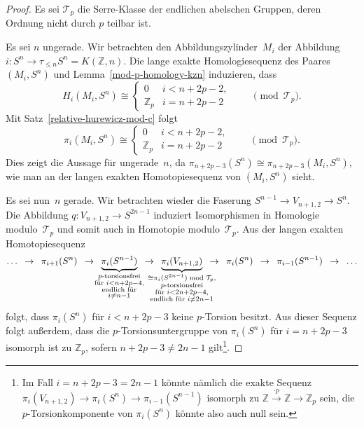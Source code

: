 \documentclass[11pt, a4paper, german]{article}
\theoremstyle{definition}
\theoremstyle{remark}
\newcommand{\R}{\mathbb{R}} %
\newcommand{\Z}{\mathbb{Z}} %
\newcommand{\T}{\mathcal{T}} %
\newcommand{\V}[2]{V_{{#2},{#1}}} %
\begin{document}
\begin{proof}
  Es sei $\T_p$ die Serre-Klasse der endlichen abelschen Gruppen, deren Ordnung nicht durch $p$ teilbar ist.

  Es sei $n$ ungerade.
  Wir betrachten den Abbildungszylinder~$M_i$ der Abbildung $i : S^n \to \tau_{\leq n} S^n = K(\Z, n)$.
  Die lange exakte Homologiesequenz des Paares $(M_i, S^n)$ und Lemma~\ref{mod-p-homology-kzn} induzieren, dass
  \[
   H_i(M_i, S^n) \cong \begin{cases}
     0 & i < n + 2p - 2, \\
     \Z_p & i = n + 2p - 2
   \end{cases}
   \qquad \pmod{\T_p}.
  \]
  Mit Satz~\ref{relative-hurewicz-mod-c} folgt
  \[
   \pi_i(M_i, S^n) \cong \begin{cases}
     0 & i < n + 2p - 2, \\
     \Z_p & i = n + 2p - 2
   \end{cases}
   \qquad \pmod{\T_p}.
  \]
  Dies zeigt die Aussage für ungerade~$n$, da $\pi_{n+2p-3}(S^n) \cong \pi_{n+2p-3}(M_i, S^n)$, wie man an der langen exakten Homotopiesequenz von $(M_i, S^n)$ sieht.

  Es sei nun~$n$ gerade.
  Wir betrachten wieder die Faserung $S^{n-1} \to \V{2}{n+1} \to S^n$.
  Die Abbildung $q : \V{2}{n+1} \to S^{2n-1}$ induziert Isomorphismen in Homologie modulo~$\T_p$ und somit auch in Homotopie modulo~$\T_p$.
  Aus der langen exakten Homotopiesequenz
  \[
    \ldots
    \enspace\to\enspace
    \pi_{i+1}(S^n)
    \enspace\to\enspace
    \underbrace{\pi_i(S^{n-1})}_{\mathclap{\substack{\text{$p$-torsionsfrei} \\ \text{für } i < n + 2p - 4, \\ \text{endlich für} \\ i \neq n-1}}}
    \enspace\to\enspace \underbrace{\pi_i(\V{2}{n+1})}_{\mathclap{\substack{\cong \pi_i(S^{2n-1}) \bmod{\T_p}, \\ \text{$p$-torsionsfrei} \\ \text{für } i < 2n + 2p - 4, \\ \text{endlich für } i \neq 2n-1}}}
    \enspace\to\enspace
    \pi_i(S^n)
    \enspace\to\enspace
    \pi_{i-1}(S^{n-1})
    \enspace\to\enspace
    \ldots
  \]
  folgt, dass $\pi_i(S^n)$ für $i < n + 2p - 3$ keine $p$-Torsion besitzt.
  Aus dieser Sequenz folgt außerdem, dass die $p$-Torsionsuntergruppe von $\pi_i(S^n)$ für $i = n + 2p - 3$ isomorph ist zu $\Z_p$, sofern $n + 2p - 3 \neq 2n - 1$ gilt\footnote{Im Fall $i = n + 2p - 3 = 2n - 1$ könnte nämlich die exakte Sequenz $\pi_i(\V{2}{n+1}) \to \pi_i(S^n) \to \pi_{i-1}(S^{n-1})$ isomorph zu $\Z \xrightarrow{\cdot p} \Z \to \Z_p$ sein, die $p$-Torsionkomponente von $\pi_i(S^n)$ könnte also auch null sein.}.
  

\end{proof}
\end{document}
